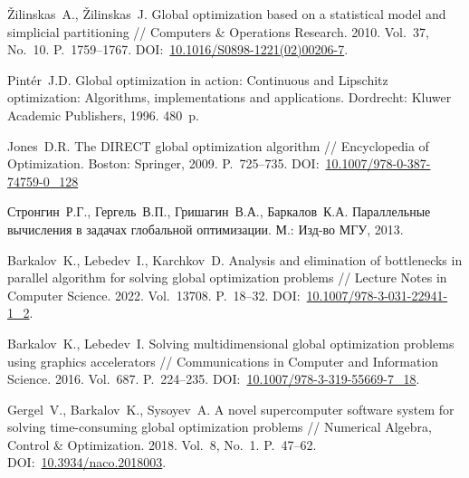 \documentclass[11pt, oneside, a4paper]{article}
\begin{document}
\begin{biblio}
Žilinskas~A., Žilinskas~J. Global optimization based on a statistical model and simplicial partitioning // Computers \& Operations Research. 2010. Vol.~37, No.~10. P.~1759--1767. DOI:~\href{http://dx.doi.org/10.1016/S0898-1221(02)00206-7}{10.1016/S0898-1221(02)00206-7}.

Pintér~J.D. Global optimization in action: Continuous and Lipschitz optimization: Algorithms, implementations and applications. Dordrecht: Kluwer Academic Publishers, 1996. 480~p.

Jones~D.R. The DIRECT global optimization algorithm // Encyclopedia of Optimization. Boston: Springer, 2009. P.~725--735. DOI:~\href{https://doi.org/10.1007/978-0-387-74759-0_128}{10.1007/978-0-387-74759-0\_128}

Стронгин~Р.Г., Гергель~В.П., Гришагин~В.А., Баркалов~К.А. Параллельные вычисления в задачах глобальной оптимизации. М.: Изд-во МГУ, 2013.

Barkalov~K., Lebedev~I., Karchkov~D. Analysis and elimination of bottlenecks in parallel algorithm for solving global optimization problems // Lecture Notes in Computer Science. 2022. Vol.~13708. P.~18--32. DOI:~\href{https://doi.org/10.1007/978-3-031-22941-1_2}{10.1007/978-3-031-22941-1\_2}.


Barkalov~K., Lebedev~I. Solving multidimensional global optimization problems using graphics accelerators // Communications in Computer and Information Science. 2016. Vol.~687. P.~224--235. DOI:~\href{http://dx.doi.org/10.1007/978-3-319-55669-7_18}{10.1007/978-3-319-55669-7\_18}.


Gergel~V., Barkalov~K., Sysoyev~A. A novel supercomputer software system for solving time-consuming global optimization problems // Numerical Algebra, Control \& Optimization. 2018. Vol.~8, No.~1. P.~47--62. DOI:~\href{http://dx.doi.org/10.3934/naco.2018003}{10.3934/naco.2018003}.








\end{biblio}
\end{document}
